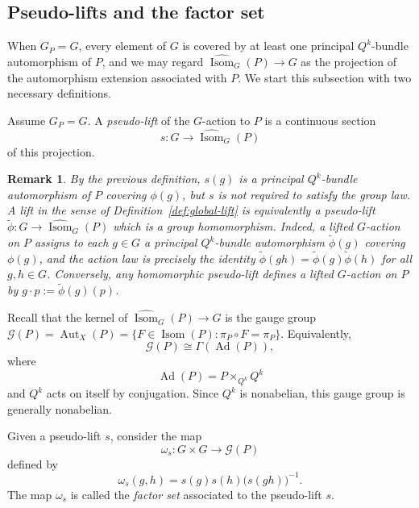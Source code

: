 \documentclass[11pt,a4paper]{article}
\numberwithin{equation}{section}
\newtheorem{remark}[definition]{Remark}
\theoremstyle{named}
\begin{document}
\subsection{Pseudo-lifts and the factor set}
 When \(G_P=G\), every element of \(G\) is covered by at least one principal \(Q^k\)-bundle automorphism of \(P\), and we may regard \(\widehat{\operatorname{Isom}}_G(P)\longrightarrow G\) as the projection of the automorphism extension associated with \(P\). We start this subsection with two necessary definitions.

\begin{definition}
\label{def:pseudo-lift}
Assume \(G_P=G\). A \emph{pseudo-lift} of the \(G\)-action to \(P\) is a continuous section
\[
s:G\longrightarrow \widehat{\operatorname{Isom}}_G(P)
\]
of this projection.
\end{definition}

\begin{remark}
\label{rem:lifts-as-homomorphic-pseudolifts}
  By the previous definition, \(s(g)\) is a principal \(Q^k\)-bundle automorphism of \(P\) covering \(\phi(g)\), but \(s\) is not required to satisfy the group law. A lift in the sense of Definition~\ref{def:global-lift} is equivalently a pseudo-lift $\widetilde\phi:G\longrightarrow \widehat{\operatorname{Isom}}_G(P)$
which is a group homomorphism. Indeed, a lifted \(G\)-action on \(P\) assigns to each \(g\in G\) a principal \(Q^k\)-bundle automorphism \(\widetilde\phi(g)\) covering \(\phi(g)\), and the action law is precisely the identity $\widetilde\phi(gh)=\widetilde\phi(g)\widetilde\phi(h)$
for all \(g,h\in G\). Conversely, any homomorphic pseudo-lift defines a lifted \(G\)-action on \(P\) by $g\cdot p:=\widetilde\phi(g)(p)$.
\end{remark}

\noindent Recall that the kernel of $\widehat{\operatorname{Isom}}_G(P)\longrightarrow G$
is the gauge group $\mathcal G(P)=\operatorname{Aut}_X(P)
=
\{F\in\operatorname{Isom}(P):\pi_P\circ F=\pi_P\}$.
Equivalently,
\[
\mathcal G(P)\cong \Gamma(\operatorname{Ad}(P)),
\]
where
\[
\operatorname{Ad}(P)=P\times_{Q^k}Q^k
\]
and \(Q^k\) acts on itself by conjugation. Since \(Q^k\) is nonabelian, this gauge group is generally nonabelian.

\begin{definition}\label{def:factor-set}
Given a pseudo-lift \(s\), consider the map
\[
\omega_s:G\times G\longrightarrow \mathcal G(P)
\]
defined by
\[
\omega_s(g,h)
=
s(g)s(h)\bigl(s(gh)\bigr)^{-1}.
\]
The map $\omega_s$ is called the \emph{factor set} associated to the pseudo-lift \(s\).
\end{definition}
\end{document}

